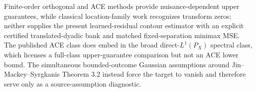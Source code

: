 Finite-order orthogonal and ACE methods provide nuisance-dependent upper guarantees, while classical location-family work recognizes transform zeros; neither supplies the present learned-residual contour estimator with an explicit certified translated-dyadic bank and matched fixed-separation minimax MSE. The published ACE class does embed in the broad direct-\(L^1(P_X)\) spectral class, which licenses a full-class upper-guarantee comparison but not an ACE lower bound. The simultaneous bounded-outcome Gaussian assumptions around Jin--Mackey--Syrgkanis Theorem 3.2 instead force the target to vanish and therefore serve only as a source-assumption diagnostic.